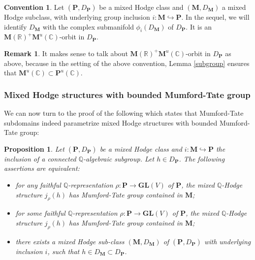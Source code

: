 \documentclass[10pt]{article}
\numberwithin{equation}{subsection}
\theoremstyle{plain}
\newtheorem{proposition}[theorem]{Proposition}
\theoremstyle{definition}
\newtheorem{convention}[theorem]{Convention}
\newtheorem{remark}[theorem]{Remark}
\theoremstyle{remark}
\newcommand{\Q}{\mathbb Q}
\newcommand{\C}{\mathbb C}
\newcommand{\R}{\mathbb R}
\newcommand{\pp}{\mathbf P}
\newcommand{\M}{\mathbf M}
\newcommand{\gl}{\mathbf{GL}}
\begin{document}
\begin{convention}
Let $(\pp, D_\pp)$ be a mixed Hodge class and $(\M,D_\M)$ a mixed Hodge subclass, with underlying group inclusion $i : \M \hookrightarrow \pp$. In the sequel, we will identify $D_\M$ with the complex submanifold $\phi_i(D_\M)$ of $D_\pp$. It is an $\M(\R)^+\M^u(\C)$-orbit in $D_\pp$. 
\end{convention}
\begin{remark}
It makes sense to talk about $\M(\R)^+\M^u(\C)$-orbit in $D_\pp$ as above, because in the setting of the above convention, Lemma \ref{subgroup} ensures that $\M^u(\C) \subset \pp^u(\C)$.
\end{remark}
\subsubsection*{Mixed Hodge structures with bounded Mumford-Tate group}
We can now turn to the proof of the following which states that Mumford-Tate subdomains indeed parametrize mixed Hodge structures with bounded Mumford-Tate group:
\begin{proposition}\label{mtbound}
Let $(\pp, D_\pp)$ be a mixed Hodge class and $i : \M \hookrightarrow \pp$ the inclusion of a connected $\Q$-algebraic subgroup. Let $h \in D_\pp$. The following assertions are equivalent:
\begin{itemize}
\item[(i)] for any faithful $\Q$-representation $\rho : \pp \rightarrow \gl(V)$ of $\pp$, the mixed $\Q$-Hodge structure $j_\rho(h)$ has Mumford-Tate group contained in $\M$;
\item[(ii)] for some faithful $\Q$-representation $\rho : \pp \rightarrow \gl(V)$ of $\pp$, the mixed $\Q$-Hodge structure $j_\rho(h)$ has Mumford-Tate group contained in $\M$;
\item[(iii)] there exists a mixed Hodge sub-class $(\M, D_\M)$ of $(\pp, D_\pp)$ with underlying inclusion $i$, such that $h \in D_\M \subset D_\pp$.
\end{itemize}
\end{proposition}
\end{document}
